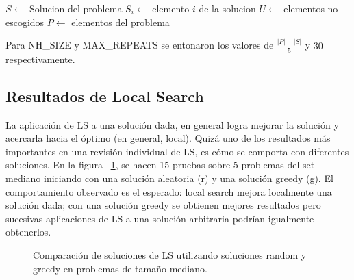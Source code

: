 \documentclass{ci5652}
\begin{document}
\begin{algorithm}
\DontPrintSemicolon
$S \leftarrow$ Solucion del problema\;
$S_i \leftarrow$ elemento $i$ de la solucion\;
$U \leftarrow$ elementos no escogidos\;
$P \leftarrow$ elementos del problema\;
\end{algorithm}

Para NH\_SIZE y MAX\_REPEATS se entonaron los valores de $\frac{|P|-|S|}{5}$ y $30$ respectivamente.

\subsection{Resultados de Local Search}
La aplicación de LS a una solución dada, en general logra mejorar la solución y acercarla hacia el óptimo (en general, local). Quizá uno de los resultados más importantes en una revisión individual de LS, es cómo se comporta con diferentes soluciones. En la figura ~\ref{fig:localsearch-solution-randomgreedy}, se hacen 15 pruebas sobre 5 problemas del set mediano iniciando con una solución aleatoria (r) y una solución greedy (g).
El comportamiento observado es el esperado: local search mejora localmente una solución dada; con una solución greedy se obtienen mejores resultados pero sucesivas aplicaciones de LS a una solución arbitraria podrían igualmente obtenerlos.

\begin{figure}[]
	\setlength\fboxsep{0pt}
	\setlength\fboxrule{0.5pt}
	\caption{Comparación de soluciones de LS utilizando soluciones random y greedy en problemas de tamaño mediano.}
	\label{fig:localsearch-solution-randomgreedy}
\end{figure}
\end{document}
